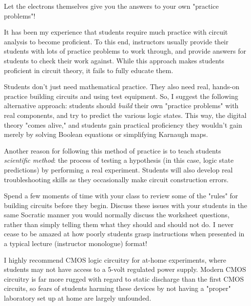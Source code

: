 





Let the electrons themselves give you the answers to your own "practice problems"!







It has been my experience that students require much practice with circuit analysis to become proficient.  To this end, instructors usually provide their students with lots of practice problems to work through, and provide answers for students to check their work against.  While this approach makes students proficient in circuit theory, it fails to fully educate them.

Students don't just need mathematical practice.  They also need real, hands-on practice building circuits and using test equipment.  So, I suggest the following alternative approach: students should {\it build} their own "practice problems" with real components, and try to predict the various logic states.  This way, the digital theory "comes alive," and students gain practical proficiency they wouldn't gain merely by solving Boolean equations or simplifying Karnaugh maps.

Another reason for following this method of practice is to teach students {\it scientific method}: the process of testing a hypothesis (in this case, logic state predictions) by performing a real experiment.  Students will also develop real troubleshooting skills as they occasionally make circuit construction errors.

Spend a few moments of time with your class to review some of the "rules" for building circuits before they begin.  Discuss these issues with your students in the same Socratic manner you would normally discuss the worksheet questions, rather than simply telling them what they should and should not do.  I never cease to be amazed at how poorly students grasp instructions when presented in a typical lecture (instructor monologue) format!

I highly recommend CMOS logic circuitry for at-home experiments, where students may not have access to a 5-volt regulated power supply.  Modern CMOS circuitry is far more rugged with regard to static discharge than the first CMOS circuits, so fears of students harming these devices by not having a "proper" laboratory set up at home are largely unfounded.

